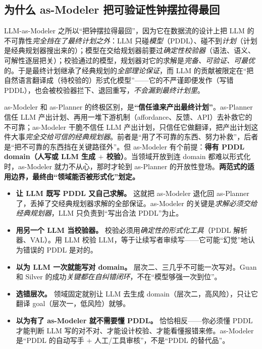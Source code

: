\subsection{为什么 as-Modeler 把可验证性钟摆拉得最回}
\label{sec:modeler-pendulum}

LLM-as-Modeler 之所以“把钟摆拉得最回”，因为它在数据流的设计上把 LLM 的不可靠性\emph{完全挡在了最终计划之外}：LLM 只碰\emph{模型}（PDDL）、碰不到\emph{计划}（计划是经典规划器搜出来的）；模型在交给规划器前要过\emph{确定性校验器}（语法、语义、可解性逐层把关）；校验通过的模型，规划器对它的求解是\emph{完备、可验证、可最优}的。于是最终计划继承了经典规划的\emph{全部理论保证}，而 LLM 的贡献被限定在“把自然语言翻译成（待校验的）形式化模型”——它的不严谨即便发作（写错 PDDL），也会被校验器拦下、退回重写，\emph{不会漏到最终计划里}。

\begin{insight}
as-Modeler 和 as-Planner 的终极区别，是\textbf{“信任谁来产出最终计划”}。as-Planner 信任 LLM 产出计划、再用一堆下游机制（affordance、反馈、API）去补救它的不可靠；as-Modeler 干脆不信任 LLM 产出计划，只信任它做翻译，把产出计划这件大事\emph{完全交给可信的经典规划器}。前者是“用了不可靠的东西、努力补救”，后者是“把不可靠的东西挡在关键路径外”。但 as-Modeler 有个前提：\textbf{得有 PDDL domain（人写或 LLM 生成 $+$ 校验）}。当领域开放到连 domain 都难以形式化时，as-Modeler 就力不从心，那时才轮到 as-Planner 的开放性登场。\textbf{两范式的适用边界，最终由“领域能否被形式化”划定。}
\end{insight}

\begin{pitfall}[本节常见陷阱]
\begin{itemize}
  \item \textbf{让 LLM 既写 PDDL 又自己求解。} 这就把 as-Modeler 退化回 as-Planner 了，丢掉了交经典规划器求解的全部保证。as-Modeler 的关键是\emph{求解必须交给经典规划器}，LLM 只负责到“写出合法 PDDL”为止。
  \item \textbf{用另一个 LLM 当校验器。} 校验必须用\emph{确定性的形式化工具}（PDDL 解析器、VAL）。用 LLM 校验 LLM，等于让续写者审续写——它可能“幻觉”地认为错误的 PDDL 是对的。
  \item \textbf{以为 LLM 一次就能写对 domain。} 层次二、三几乎不可能一次写对。Guan 和 Silver 的成功\emph{关键都在自纠错闭环}，不在“模型够强一次到位”。
  \item \textbf{选错层次。} 领域固定就别让 LLM 去生成 domain（层次二，高风险），只让它翻译 goal（层次一，低风险）就够。
  \item \textbf{以为有了 as-Modeler 就不需要懂 PDDL。} 恰恰相反——你必须懂 PDDL 才能判断 LLM 写的对不对、才能设计校验、才能看懂报错来修。as-Modeler 是“PDDL 的自动写手 $+$ 人工/工具审核”，不是“PDDL 的替代品”。
\end{itemize}
\end{pitfall}

